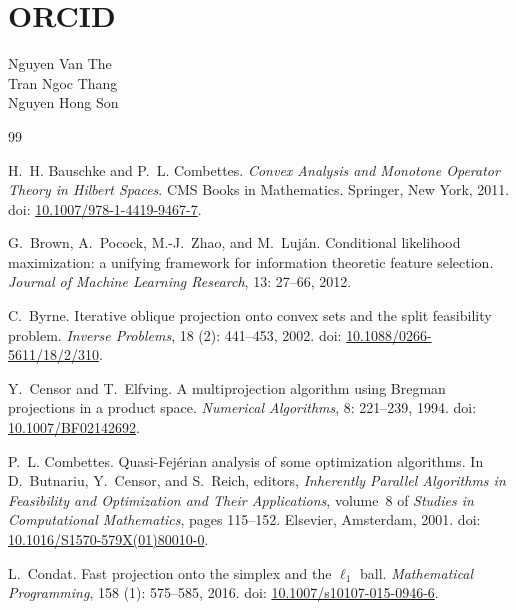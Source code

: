 \documentclass[]{interact}
\theoremstyle{plain}
\theoremstyle{definition}
\theoremstyle{remark}
\begin{document}
\section*{ORCID}
\noindent Nguyen Van The~\\
Tran Ngoc Thang~\\
Nguyen Hong Son~


\begin{thebibliography}{99}
\newcommand{\bibdoi}[1]{doi: {\urlstyle{rm}\url{#1}}}

H.~H. Bauschke and P.~L. Combettes.
\newblock \emph{Convex Analysis and Monotone Operator Theory in {H}ilbert Spaces}.
\newblock CMS Books in Mathematics. Springer, New York, 2011.
\newblock \bibdoi{10.1007/978-1-4419-9467-7}.

G.~Brown, A.~Pocock, M.-J.~Zhao, and M.~Luj{\'a}n.
\newblock Conditional likelihood maximization: a unifying framework for information theoretic feature selection.
\newblock \emph{Journal of Machine Learning Research}, 13: 27--66, 2012.

C.~Byrne.
\newblock Iterative oblique projection onto convex sets and the split feasibility problem.
\newblock \emph{Inverse Problems}, 18 (2): 441--453, 2002.
\newblock \bibdoi{10.1088/0266-5611/18/2/310}.

Y.~Censor and T.~Elfving.
\newblock A multiprojection algorithm using {B}regman projections in a product space.
\newblock \emph{Numerical Algorithms}, 8: 221--239, 1994.
\newblock \bibdoi{10.1007/BF02142692}.

P.~L. Combettes.
\newblock Quasi-Fej{\'e}rian analysis of some optimization algorithms.
\newblock In D.~Butnariu, Y.~Censor, and S.~Reich, editors, \emph{Inherently Parallel Algorithms in Feasibility and Optimization and Their Applications}, volume~8 of \emph{Studies in Computational Mathematics}, pages 115--152. Elsevier, Amsterdam, 2001.
\newblock \bibdoi{10.1016/S1570-579X(01)80010-0}.

L.~Condat.
\newblock Fast projection onto the simplex and the $\ell_1$ ball.
\newblock \emph{Mathematical Programming}, 158 (1): 575--585, 2016.
\newblock \bibdoi{10.1007/s10107-015-0946-6}.


\end{thebibliography}
\end{document}
